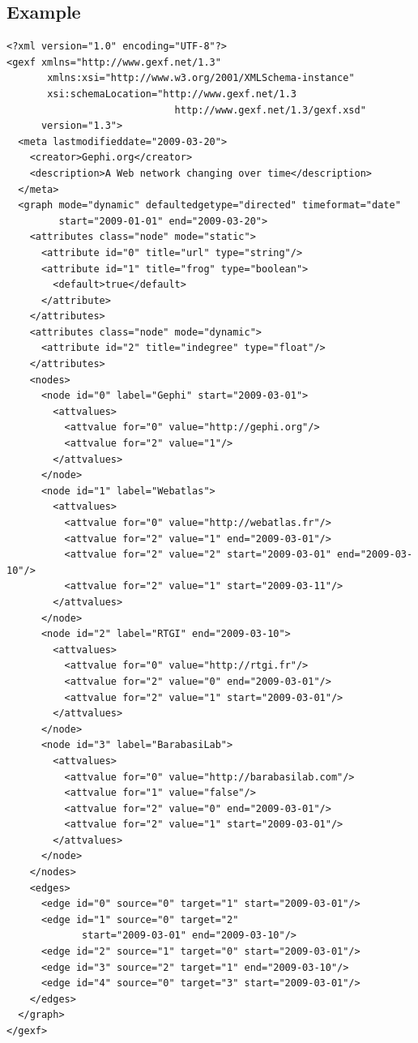\documentclass[a4paper,10pt]{article}
\begin{document}
\subsection{Example}

\lstset{ style=gexf }
\begin{lstlisting}[caption={A (small) Dynamic Web Graph with continuous time},label=dynwebgraph]
<?xml version="1.0" encoding="UTF-8"?>
<gexf xmlns="http://www.gexf.net/1.3"
       xmlns:xsi="http://www.w3.org/2001/XMLSchema-instance"
       xsi:schemaLocation="http://www.gexf.net/1.3
                             http://www.gexf.net/1.3/gexf.xsd"
      version="1.3">
  <meta lastmodifieddate="2009-03-20">
    <creator>Gephi.org</creator>
    <description>A Web network changing over time</description>
  </meta>
  <graph mode="dynamic" defaultedgetype="directed" timeformat="date"
         start="2009-01-01" end="2009-03-20">
    <attributes class="node" mode="static">
      <attribute id="0" title="url" type="string"/>
      <attribute id="1" title="frog" type="boolean">
        <default>true</default>
      </attribute>
    </attributes>
    <attributes class="node" mode="dynamic">
      <attribute id="2" title="indegree" type="float"/>
    </attributes>
    <nodes>
      <node id="0" label="Gephi" start="2009-03-01">
        <attvalues>
          <attvalue for="0" value="http://gephi.org"/>
          <attvalue for="2" value="1"/>
        </attvalues>
      </node>
      <node id="1" label="Webatlas">
        <attvalues>
          <attvalue for="0" value="http://webatlas.fr"/>
          <attvalue for="2" value="1" end="2009-03-01"/>
          <attvalue for="2" value="2" start="2009-03-01" end="2009-03-10"/>
          <attvalue for="2" value="1" start="2009-03-11"/>
        </attvalues>
      </node>
      <node id="2" label="RTGI" end="2009-03-10">
        <attvalues>
          <attvalue for="0" value="http://rtgi.fr"/>
          <attvalue for="2" value="0" end="2009-03-01"/>
          <attvalue for="2" value="1" start="2009-03-01"/>
        </attvalues>
      </node>
      <node id="3" label="BarabasiLab">
        <attvalues>
          <attvalue for="0" value="http://barabasilab.com"/>
          <attvalue for="1" value="false"/>
          <attvalue for="2" value="0" end="2009-03-01"/>
          <attvalue for="2" value="1" start="2009-03-01"/>
        </attvalues>
      </node>
    </nodes>
    <edges>
      <edge id="0" source="0" target="1" start="2009-03-01"/>
      <edge id="1" source="0" target="2"
             start="2009-03-01" end="2009-03-10"/>
      <edge id="2" source="1" target="0" start="2009-03-01"/>
      <edge id="3" source="2" target="1" end="2009-03-10"/>
      <edge id="4" source="0" target="3" start="2009-03-01"/>
    </edges>
  </graph>
</gexf>
\end{lstlisting}
\end{document}
